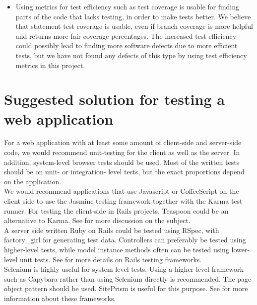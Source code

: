 \begin{itemize}
\item Using metrics for test efficiency such as test coverage is usable
for finding parts of the code that lacks testing, in order to make tests
better. We believe that statement test coverage is usable, even if
branch coverage is more helpful and returns more fair coverage
percentages. The increased test efficiency could possibly lead to
finding more software defects due to more efficient tests, but we have
not found any defects of this type by using test efficiency metrics in
this project.\\

\end{itemize}


\section{Suggested solution for testing a web application}

For a web application with at least some amount of client-side and
server-side code, we would recommend unit-testing for the client as well
as the server. In addition, system-level browser tests should be used.
Most of the written tests should be on unit- or integration- level
tests, but the exact proportions depend on the application.\\

We would recommend applications that use Javascript or CoffeeScript on
the client side to use the Jasmine testing framework together with the
Karma test runner. For testing the client-side in Rails projects,
Teaspoon could be an alternative to Karma. See  for
more discussion on the subject.\\

A server side written Ruby on Rails could be tested using RSpec, with
factory\_girl for generating test data. Controllers can preferably be
tested using higher-level tests, while model instance methods often can
be tested using lower-level unit tests. See  for
more details on Rails testing frameworks.\\

Selenium is highly useful for system-level tests. Using a higher-level
framework such as Capybara rather than using Selenium directly is
recommended. The page object pattern should be used. SitePrism is useful
for this purpose. See  for more information
about these frameworks.\\

